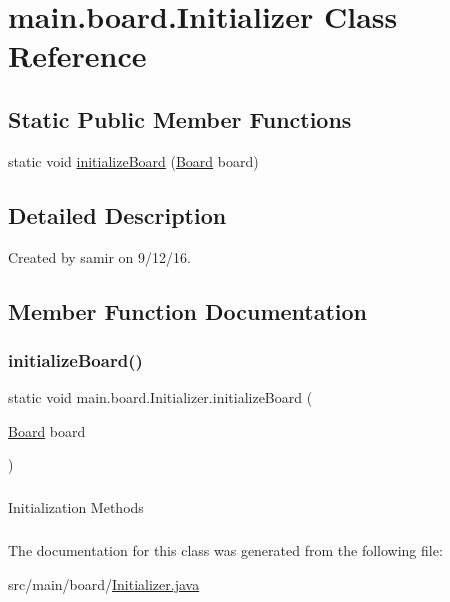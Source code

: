\hypertarget{classmain_1_1board_1_1_initializer}{}\section{main.\+board.\+Initializer Class Reference}
\label{classmain_1_1board_1_1_initializer}
\subsection*{Static Public Member Functions}
\begin{DoxyCompactItemize}
\item 
static void \hyperlink{classmain_1_1board_1_1_initializer_a634617c1ac996440a729d5fedfa577bf}{initialize\+Board} (\hyperlink{classmain_1_1board_1_1_board}{Board} board)
\end{DoxyCompactItemize}


\subsection{Detailed Description}
Created by samir on 9/12/16. 

\subsection{Member Function Documentation}
\hypertarget{classmain_1_1board_1_1_initializer_a634617c1ac996440a729d5fedfa577bf}{}\label{classmain_1_1board_1_1_initializer_a634617c1ac996440a729d5fedfa577bf} 
\subsubsection{\texorpdfstring{initialize\+Board()}{initializeBoard()}}
{\footnotesize\ttfamily static void main.\+board.\+Initializer.\+initialize\+Board (\begin{DoxyParamCaption}\item[{\hyperlink{classmain_1_1board_1_1_board}{Board}}]{board }\end{DoxyParamCaption})\hspace{0.3cm}{\ttfamily [static]}}

\subparagraph*{}

Initialization Methods \subparagraph*{}

The documentation for this class was generated from the following file\+:\begin{DoxyCompactItemize}
\item 
src/main/board/\hyperlink{_initializer_8java}{Initializer.\+java}\end{DoxyCompactItemize}
